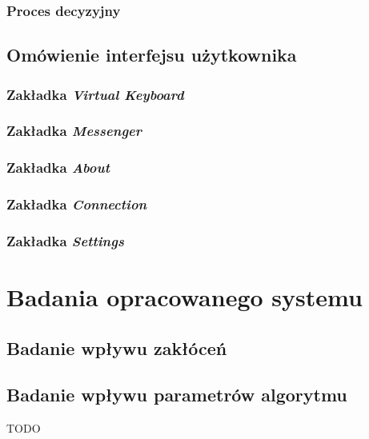 \documentclass[skorowidz,skroty]{dyplomWEZUT}
\begin{document}
\subsection{Proces decyzyjny}
\section{Omówienie interfejsu użytkownika}
\subsection{Zakładka \textit{Virtual Keyboard}}
\subsection{Zakładka \textit{Messenger}}
\subsection{Zakładka \textit{About}}
\subsection{Zakładka \textit{Connection}}
\subsection{Zakładka \textit{Settings}}

\chapter{Badania opracowanego systemu}
\section{Badanie wpływu zakłóceń}
\section{Badanie wpływu parametrów algorytmu}



\begin{zakonczenie}\label{chap:zakonczenie}
TODO
\end{zakonczenie}

\printbibliography[heading=bibintoc]

\listoftables

\listoffigures

\listoflistings


\printindex
\end{document}

